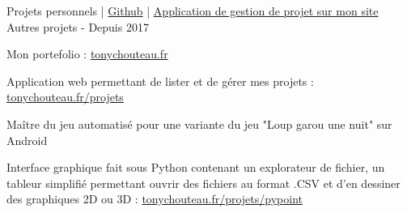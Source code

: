 \begin{cventries}
  \cventry
    {Projets personnels | \href{https://github.com/TonyChouteau?tab=repositories}{\faGithubSquare\acvHeaderIconSep Github} | 
    \href{https://www.tonychouteau.fr/projets/}
    {\faHome\acvHeaderIconSep Application de gestion de projet sur mon site} %
    } %
    {Autres projets} %
    {-} %
    {Depuis 2017} %
    {
      \begin{cvitems} %
        \item {Mon portefolio : \href{https://www.tonychouteau.fr}{tonychouteau.fr}}
        \item {Application web permettant de lister et de gérer mes projets : \href{https://www.tonychouteau.fr/projets}{tonychouteau.fr/projets}}
        \item {Maître du jeu automatisé pour une variante du jeu "Loup garou une nuit" sur Android}
        \item {Interface graphique fait sous Python contenant un explorateur de fichier, un tableur simplifié permettant ouvrir des fichiers au format .CSV et d’en dessiner des graphiques 2D ou 3D : \href{https://www.tonychouteau.fr/projets/pypoint}{tonychouteau.fr/projets/pypoint}}
      \end{cvitems}
    }
\end{cventries}
